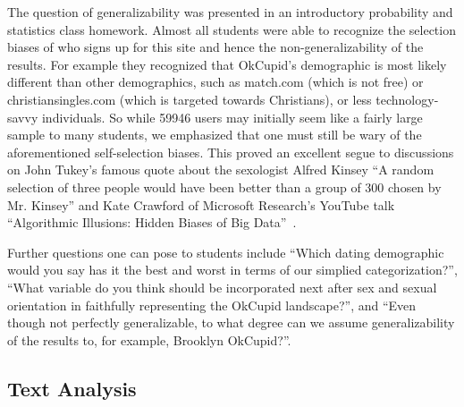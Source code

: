 \documentclass{article}\usepackage[]{graphicx}\usepackage[]{color}
\begin{document}
The question of generalizability was presented in an introductory probability and statistics class homework.  Almost all students were able to recognize the selection biases of who signs up for this site and hence the non-generalizability of the results.  For example they recognized that OkCupid's demographic is most likely different than other demographics, such as match.com (which is not free) or christiansingles.com (which is targeted towards Christians), or less technology-savvy individuals.  So while 59946 users may initially seem like a fairly large sample to many students, we emphasized that one must still be wary of the aforementioned self-selection biases.  This proved an excellent segue to discussions on John Tukey's famous quote about the sexologist Alfred Kinsey ``A random selection of three people would have been better than a group of 300 chosen by Mr. Kinsey'' and Kate Crawford of Microsoft Research's YouTube talk ``Algorithmic Illusions: Hidden Biases of Big Data''~\cite{Strata}.

Further questions one can pose to students include ``Which dating demographic would you say has it the best and worst in terms of our simplied categorization?'', ``What variable do you think should be incorporated next after sex and sexual orientation in faithfully representing the OkCupid landscape?'',  and ``Even though not perfectly generalizable, to what degree can we assume generalizability of the results to, for example, Brooklyn OkCupid?''.







\subsection{Text Analysis}\label{essays}
\end{document}
